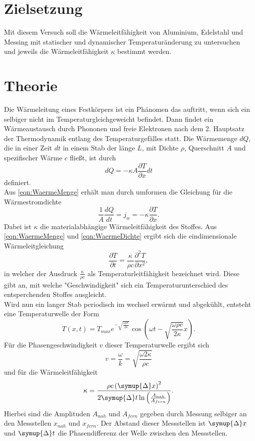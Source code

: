 \section{Zielsetzung}
\label{sec:Zielsetzung}
Mit diesem Versuch soll die Wärmeleitfähigkeit von Aluminium, Edelstahl und Messing
mit statischer und dynamischer Temperaturänderung zu untersuchen und jeweils die Wärmeleitfähigkeit $\kappa$ bestimmt werden.
\section{Theorie}
\label{sec:Theorie}
Die Wärmeleitung eines Festkörpers ist ein Phänomen das auftritt, wenn sich ein selbiger nicht im Temperaturgleichgeweicht
befindet. Dann findet ein Wärmeaustausch durch Phononen und freie Elektronen nach dem 2. Hauptsatz der Thermodynamik entlang des Temperaturgefälles statt.
Die Wärmemenge $dQ$, die in einer Zeit $dt$ in einem Stab der länge $L$, mit Dichte $\rho$, Querschnitt $A$ und spezifischer Wärme $c$ fließt, ist durch
\begin{equation}
    \label{eqn:WaermeMenge}
    dQ = -\kappa A\frac{\partial T}{\partial x}dt
\end{equation}
definiert.\\
Aus \eqref{eqn:WaermeMenge} erhält man durch umformen die Gleichung für die Wärmestromdichte
\begin{equation}
    \label{eqn:WaermeDichte}
    \frac{1}{A}\frac{dQ}{dt} = j_w = -\kappa \frac{\partial T}{\partial x}.
\end{equation}
Dabei ist $\kappa$ die materialabhängige Wärmeleitfähigkeit des Stoffes.
Aus \eqref{eqn:WaermeMenge} und \eqref{eqn:WaermeDichte} ergibt sich die eindimensionale Wärmeleitgleichung
\begin{equation}
    \frac{\partial T}{\partial t} = \frac{\kappa}{\rho c}\frac{\partial^2 T}{\partial x^2},
\end{equation}
in welcher der Ausdruck $\frac{\kappa}{\rho c}$ als Temperaturleitfähigkeit bezeichnet wird. Diese gibt an,
mit welche "Geschwindigkeit" sich ein Temperaturunterschied des entsperchenden Stoffes ausgleicht.
\\
Wird nun ein langer Stab periodisch im wechsel erwärmt und abgekühlt, entsteht eine Temperaturwelle der Form
\begin{equation}
    T\left(x,t\right) = T_{max}e^{-\sqrt{\frac{\omega \rho c}{2\kappa}}}\cos\left(\omega t - \sqrt{\frac{\omega \rho c}{2\kappa}}x\right).
\end{equation}
Für die Phasengeschwindigkeit $v$ dieser Temperaturwelle ergibt sich
\begin{equation}
    v = \frac{\omega}{k} = \sqrt{\frac{\omega 2 \kappa}{\rho c}}
\end{equation}
und für die Wärmeleitfähigkeit
\begin{equation}
    \label{eqn:kappa}
    \kappa = \frac{\rho c \left(\symup{\Delta}x\right)^2}{2\symup{\Delta}t\ln\left(\frac{A_{nah}}{A_{fern}}\right)}.
\end{equation}
Hierbei sind die Amplituden $A_{nah}$ und $A_{fern}$ gegeben durch Messung selbiger an den Messstellen $x_{nah}$ und $x_{fern}$.
Der Abstand dieser Messstellen ist $\symup{\Delta}x$ und $\symup{\Delta}t$ die Phasendifferenz der Welle zwischen den Messstellen.